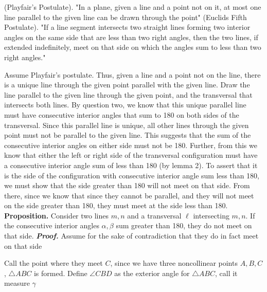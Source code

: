 \documentclass{report}
\begin{document}
        \bigbreak \noindent 
    \begin{remark}
        (Playfair's Postulate). "In a plane, given a line and a point not on it, at most one line parallel to the given line can be drawn through the point"
        \bigbreak \noindent 
        (Euclids Fifth Postulate). "If a line segment intersects two straight lines forming two interior angles on the same side that are less than two right angles, then the two lines, if extended indefinitely, meet on that side on which the angles sum to less than two right angles."
    \end{remark}
    \bigbreak \noindent 
    Assume Playfair's postulate. Thus, given a line and a point not on the line, there is a unique line through the given point parallel with the given line. Draw the line parallel to the given line through the given point, and the transversal that intersects both lines. By question two, we know that this unique parallel line must have consecutive interior angles that sum to 180 on both sides of the transversal. Since this parallel line is unique, all other lines through the given point must not be parallel to the given line. This suggests that the sum of the consecutive interior angles on either side must not be 180. Further, from this we know that either the left or right side of the transversal configuration must have a consecutive interior angle sum of less than 180 (by lemma 2). To assert that it is the side of the configuration with consecutive interior angle sum less than 180, we must show that the side greater than 180 will not meet on that side. From there, since we know that since they cannot be parallel, and they will not meet on the side greater than 180, they must meet at the side less than 180.
    \bigbreak \noindent 
    \textbf{Proposition.} Consider two lines $m,n$ and a transversal $\ell$ intersecting $m,n$. If the consecutive interior angles $\alpha,\beta$ sum greater than 180, they do not meet on that side.
    \bigbreak \noindent 
    \textbf{\textit{Proof.}} Assume for the sake of contradiction that they do in fact meet on that side
    \pagebreak \bigbreak \noindent 
    \begin{figure}[ht]
        \centering
        \label{fig:tr2}
    \end{figure}
    \bigbreak \noindent 
    Call the point where they meet $C$, since we have three noncollinear points $A,B,C$, $\triangle ABC$ is formed.
    \bigbreak \noindent 
    Define $\angle CBD$ as the exterior angle for $\triangle ABC$, call it measure $\gamma$
\end{document}
